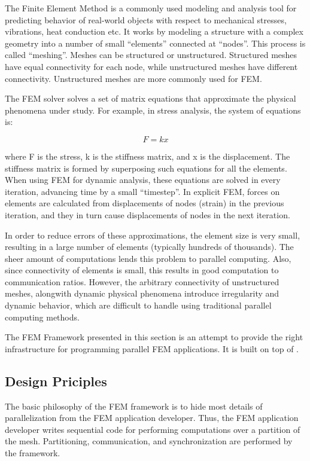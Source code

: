The Finite Element Method is a commonly used modeling and analysis tool for
predicting behavior of real-world objects with respect to mechanical stresses,
vibrations, heat conduction etc. It works by modeling a structure with a
complex geometry into a number of small ``elements'' connected at ``nodes''.
This process is called ``meshing''. Meshes can be structured or unstructured.
Structured meshes have equal connectivity for each node, while unstructured
meshes have different connectivity.  Unstructured meshes are more commonly used
for FEM.

The FEM solver solves a set of matrix equations that approximate the physical
phenomena under study. For example, in stress analysis, the system of equations
is:

$$
F = k x
$$

where F is the stress, k is the stiffness matrix, and x is the displacement.
The stiffness matrix is formed by superposing such equations for all the
elements. When using FEM for dynamic analysis, these equations are solved in
every iteration, advancing time by a small ``timestep''. In explicit FEM,
forces on elements are calculated from displacements of nodes (strain) in the
previous iteration, and they in turn cause displacements of nodes in the next
iteration.

In order to reduce errors of these approximations, the element size is very
small, resulting in a large number of elements (typically hundreds of
thousands). The sheer amount of computations lends this problem to parallel
computing. Also, since connectivity of elements is small, this results in good
computation to communication ratios. However, the arbitrary connectivity of
unstructured meshes, alongwith dynamic physical phenomena introduce
irregularity and dynamic behavior, which are difficult to handle using
traditional parallel computing methods.

The FEM Framework presented in this section is an attempt to provide the right
infrastructure for programming parallel FEM applications. It is built on top of
\charmpp.

\subsection{Design Priciples}

The basic philosophy of the FEM framework is to hide most details of
parallelization from the FEM application developer. Thus, the FEM application
developer writes sequential code for performing computations over a partition
of the mesh. Partitioning, communication, and synchronization are performed by
the framework.

